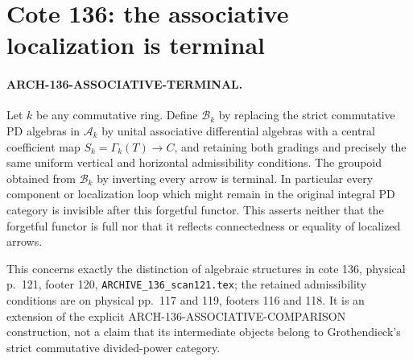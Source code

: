 \section{Cote 136: the associative localization is terminal}
\label{sec:136associativeterminal}

\paragraph{ARCH-136-ASSOCIATIVE-TERMINAL.}
Let $k$ be any commutative ring. Define $\mathcal B_k$ by
replacing the strict commutative PD algebras in
$\mathcal A_k$ by unital associative differential algebras
with a central coefficient map $S_k=\Gamma_k(T)\to C$,
and retaining both gradings and precisely the same uniform
vertical and horizontal admissibility conditions. The
groupoid obtained from $\mathcal B_k$ by inverting every
arrow is terminal. In particular every component or
localization loop which might remain in the original
integral PD category is invisible after this forgetful
functor. This asserts neither that the forgetful functor
is full nor that it reflects connectedness or equality
of localized arrows.

This concerns exactly the distinction of algebraic
structures in cote 136, physical p.~121, footer 120,
\texttt{ARCHIVE\_136\_scan121.tex}; the retained admissibility
conditions are on physical pp.~117 and 119, footers
116 and 118. It is an extension of the explicit
ARCH-136-ASSOCIATIVE-COMPARISON construction, not a
claim that its intermediate objects belong to
Grothendieck's strict commutative divided-power category.


